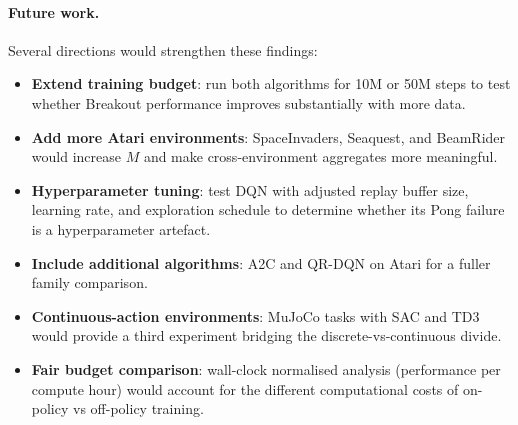 \paragraph{Future work.}
Several directions would strengthen these findings:
\begin{itemize}
  \item \textbf{Extend training budget}: run both algorithms for 10M
        or 50M steps to test whether Breakout performance improves
        substantially with more data.
  \item \textbf{Add more Atari environments}: SpaceInvaders, Seaquest,
        and BeamRider would increase $M$ and make cross-environment
        aggregates more meaningful.
  \item \textbf{Hyperparameter tuning}: test DQN with adjusted replay
        buffer size, learning rate, and exploration schedule to
        determine whether its Pong failure is a hyperparameter artefact.
  \item \textbf{Include additional algorithms}: A2C and QR-DQN on
        Atari for a fuller family comparison.
  \item \textbf{Continuous-action environments}: MuJoCo tasks with
        SAC and TD3 would provide a third experiment bridging the
        discrete-vs-continuous divide.
  \item \textbf{Fair budget comparison}: wall-clock normalised
        analysis (performance per compute hour) would account for
        the different computational costs of on-policy vs off-policy
        training.
\end{itemize}
